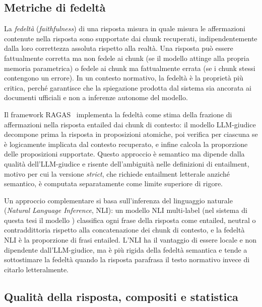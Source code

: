 \subsection{Metriche di fedeltà}
\label{subsec:metr-faithfulness}

La \emph{fedeltà} (\emph{faithfulness}) di una risposta misura in quale misura
le affermazioni contenute nella risposta sono supportate dai chunk recuperati,
indipendentemente dalla loro correttezza assoluta rispetto alla realtà. Una
risposta può essere fattualmente corretta ma non fedele ai chunk (se il
modello attinge alla propria memoria parametrica) o fedele ai chunk ma
fattualmente errata (se i chunk stessi contengono un errore). In un contesto
normativo, la fedeltà è la proprietà più critica, perché garantisce che la
spiegazione prodotta dal sistema sia ancorata ai documenti ufficiali e non
a inferenze autonome del modello.

Il framework RAGAS~\cite{ragas2024} implementa la fedeltà come stima della
frazione di affermazioni nella risposta entailed dai chunk di contesto: il
modello LLM-giudice decompone prima la risposta in proposizioni atomiche,
poi verifica per ciascuna se è logicamente implicata dal contesto recuperato,
e infine calcola la proporzione delle proposizioni supportate. Questo approccio
è semantico ma dipende dalla qualità dell'LLM-giudice e risente dell'ambiguità
nelle definizioni di entailment, motivo per cui la versione \emph{strict},
che richiede entailment letterale anziché semantico, è computata
separatamente come limite superiore di rigore.

Un approccio complementare si basa sull'inferenza del linguaggio naturale
(\emph{Natural Language Inference}, NLI): un modello NLI multi-label (nel sistema di questa tesi il modello
\nlimodel{}) classifica ogni frase della risposta come entailed, neutral
o contraddittoria rispetto alla concatenazione dei chunk di contesto, e la
fedeltà NLI è la proporzione di frasi entailed. L'NLI ha il vantaggio di
essere locale e non dipendente dall'LLM-giudice, ma è più rigida della
fedeltà semantica e tende a sottostimare la fedeltà quando la risposta
parafrasa il testo normativo invece di citarlo letteralmente.

\subsection{Qualità della risposta, compositi e statistica}
\label{subsec:metr-quality}

